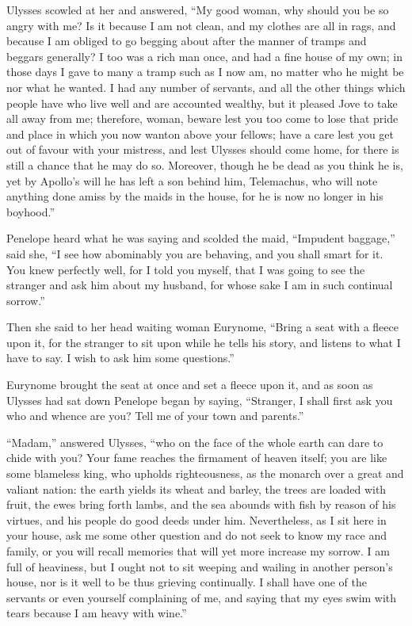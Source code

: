 Ulysses scowled at her and answered, “My good woman, why should you be so angry
with me? Is it because I am not clean, and my clothes are all in rags, and
because I am obliged to go begging about after the manner of tramps and beggars
generally? I too was a rich man once, and had a fine house of my own; in those
days I gave to many a tramp such as I now am, no matter who he might be nor
what he wanted. I had any number of servants, and all the other things which
people have who live well and are accounted wealthy, but it pleased Jove to
take all away from me; therefore, woman, beware lest you too come to lose that
pride and place in which you now wanton above your fellows; have a care lest
you get out of favour with your mistress, and lest Ulysses should come home,
for there is still a chance that he may do so. Moreover, though he be dead as
you think he is, yet by Apollo’s will he has left a son behind him, Telemachus,
who will note anything done amiss by the maids in the house, for he is now no
longer in his boyhood.”

Penelope heard what he was saying and scolded the maid, “Impudent baggage,”
said she, “I see how abominably you are behaving, and you shall smart for it.
You knew perfectly well, for I told you myself, that I was going to see the
stranger and ask him about my husband, for whose sake I am in such continual
sorrow.”

Then she said to her head waiting woman Eurynome, “Bring a seat with a fleece
upon it, for the stranger to sit upon while he tells his story, and listens to
what I have to say. I wish to ask him some questions.”

Eurynome brought the seat at once and set a fleece upon it, and as soon as
Ulysses had sat down Penelope began by saying, “Stranger, I shall first ask you
who and whence are you? Tell me of your town and parents.”

“Madam,” answered Ulysses, “who on the face of the whole earth can dare to
chide with you? Your fame reaches the firmament of heaven itself; you are like
some blameless king, who upholds righteousness, as the monarch over a great and
valiant nation: the earth yields its wheat and barley, the trees are loaded
with fruit, the ewes bring forth lambs, and the sea abounds with fish by reason
of his virtues, and his people do good deeds under him. Nevertheless, as I sit
here in your house, ask me some other question and do not seek to know my race
and family, or you will recall memories that will yet more increase my sorrow.
I am full of heaviness, but I ought not to sit weeping and wailing in another
person’s house, nor is it well to be thus grieving continually. I shall have
one of the servants or even yourself complaining of me, and saying that my eyes
swim with tears because I am heavy with wine.”

